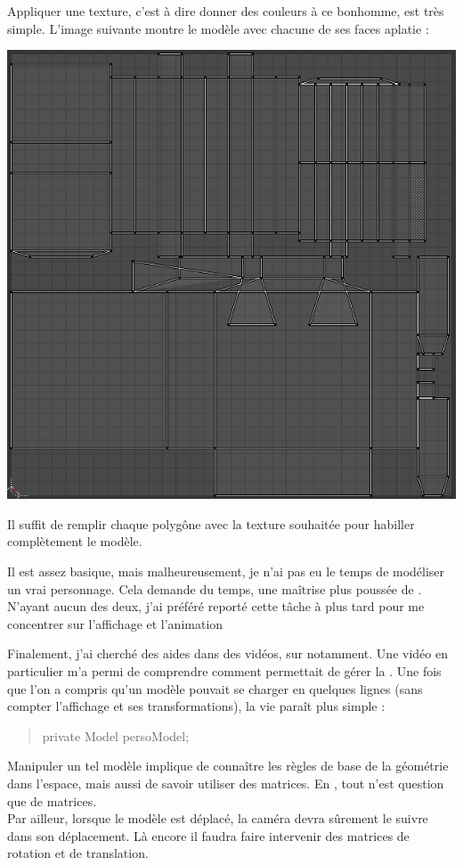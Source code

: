 \documentclass{article}
\begin{document}
Appliquer une texture, c'est à dire donner des couleurs à ce bonhomme, est très simple. L'image suivante montre le modèle  avec chacune de ses faces aplatie : 
 \begin{center}
\includegraphics[scale=0.5]{UVmapping}
\end{center}
Il suffit de remplir chaque polygône avec la texture souhaitée pour habiller complètement le modèle.

Il est assez basique, mais malheureusement, je n'ai pas eu le temps de modéliser un vrai personnage. Cela demande du temps, une maîtrise plus poussée de . N'ayant aucun des deux, j'ai préféré reporté cette tâche à plus tard pour me concentrer sur l'affichage et l'animation 

Finalement, j'ai cherché des aides dans des vidéos, sur  notamment. Une vidéo en particulier m'a permi de comprendre comment  permettait de gérer la . Une fois que l'on a compris qu'un modèle  pouvait se charger en quelques lignes (sans compter l'affichage et ses transformations), la vie paraît plus simple : \begin{quote}
private Model persoModel;
\end{quote}

Manipuler un tel modèle implique de connaître les règles de base de la géométrie dans l'espace, mais aussi de savoir utiliser des matrices. En , tout n'est question que de matrices. \\
Par ailleur, lorsque le modèle est déplacé, la caméra devra sûrement le suivre dans son déplacement. Là encore il faudra faire intervenir des matrices de rotation et de translation.
\newline
\end{document}
